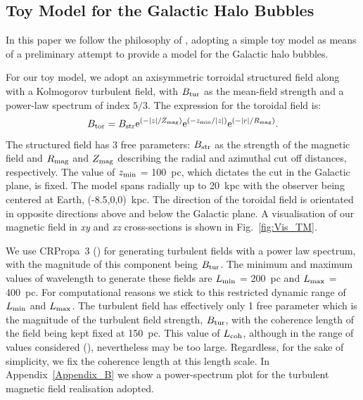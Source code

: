 \documentclass[usenatbib]{mnras}
\begin{document}
\subsection{Toy Model for the Galactic Halo Bubbles}
\label{GMF}
In this paper we follow the philosophy of \cite{West_Helicity}, adopting a simple toy model as means of a preliminary attempt to provide a model for the Galactic halo bubbles. 

For our toy model, we adopt an axisymmetric torroidal structured field along with a Kolmogorov turbulent field, with $B_{\rm{tur}}$ as the mean-field strength and a power-law spectrum of index $5/3$. The expression for the toroidal field is:
\begin{equation}\label{TM_equation}
B_{\rm{tor}} = B_{\rm{str}} {\rm{e}}^{(-|z|/Z_{\rm{mag}})} {\rm{e}}^{(-z_{\rm{min}}/|z|)} {\rm{e}}^{(-|r|/R_{\rm{mag}})}.
\end{equation}
The structured field has 3 free parameters: $B_{\rm str}$ as the strength of the magnetic field and $R_{\rm {mag}}$ and $Z_{\rm {mag}}$ describing the radial and azimuthal cut off distances, respectively. The value of $z_{\rm min}$ = 100~pc, which dictates the cut in the Galactic plane, is fixed. The model spans radially up to 20~kpc with the observer being centered at Earth, (-8.5,0,0)~kpc. The direction of the toroidal field is orientated in opposite directions above and below the Galactic plane. A visualisation of our magnetic field in \textit{xy} and \textit{xz} cross-sections is shown in Fig.~\ref{fig:Vis_TM}. 

We use CRPropa~3 (\cite{CRPropa3_2016}) for generating turbulent fields with a power law spectrum, with the magnitude of this component being $B_{\rm{tur}}$. 
The minimum and maximum values of wavelength to generate these fields are  $L_{\rm min}$ = 200~pc and $L_{\rm max}$ = 400~pc. For computational reasons we stick to this restricted dynamic range of $L_{\rm min}$ and $L_{\rm max}$. The turbulent field has effectively only 1 free parameter which is the magnitude of the turbulent field strength, $ B_{\rm tur}$, with the coherence length of the field being kept fixed at 150~pc. This value of $L_{\rm coh}$, although in the range of values considered (\cite{Ohno_1993, Chepurnov_2010, Haverkorn_2013, Giacinti_2018}), nevertheless may be too large. Regardless, for the sake of simplicity, we fix the coherence length at this length scale. In Appendix~\ref{Appendix_B} we show a power-spectrum plot for the turbulent magnetic field realisation adopted.
\end{document}
